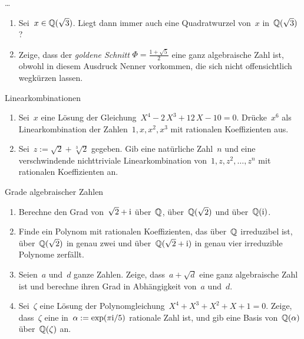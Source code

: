 \documentclass{algblatt}
\begin{document}
\vspace*{-1.5cm}

\begin{aufgabe}{\ldots}
\begin{enumerate}
\item Sei~$x \in \mathbb{Q}(\sqrt{3})$. Liegt dann immer auch eine Quadratwurzel
von~$x$ in~$\mathbb{Q}(\sqrt{3})$?
\item Zeige, dass der \emph{goldene Schnitt} $\Phi = \frac{1+\sqrt{5}}{2}$ eine
ganz algebraische Zahl ist, obwohl in diesem Ausdruck Nenner vorkommen, die
sich nicht offensichtlich wegkürzen lassen.
\end{enumerate}
\end{aufgabe}

\begin{aufgabe}{Linearkombinationen}
\begin{enumerate}
\item Sei~$x$ eine Lösung der Gleichung~$X^4-2\,X^3+12\,X-10=0$. Drücke~$x^6$
als Linearkombination der Zahlen~$1,x,x^2,x^3$ mit rationalen Koeffizienten
aus.
\item Sei~$z := \sqrt{2} + \sqrt[3]{2}$ gegeben. Gib eine
natürliche Zahl~$n$ und eine verschwindende nichttriviale Linearkombination
von~$1,z,z^2,\ldots,z^n$ mit rationalen Koeffizienten an.
\end{enumerate}
\end{aufgabe}

\begin{aufgabe}{Grade algebraischer Zahlen}
\begin{enumerate}
\item Berechne den Grad von~$\sqrt{2} + \mathrm{i}$ über~$\mathbb{Q}$, über~$\mathbb{Q}(\sqrt{2})$ und
über~$\mathbb{Q}(\mathrm{i})$.
\item Finde ein Polynom mit rationalen Koeffizienten, das über~$\mathbb{Q}$
irreduzibel ist, über~$\mathbb{Q}(\sqrt{2})$ in genau zwei und über~$\mathbb{Q}(\sqrt{2}+\mathrm{i})$
in genau vier irreduzible Polynome zerfällt.
\item Seien~$a$ und~$d$ ganze Zahlen. Zeige, dass~$a + \sqrt{d}$ eine ganz
algebraische Zahl ist und berechne ihren Grad in Abhängigkeit von~$a$ und~$d$.
\item Sei~$\zeta$ eine Lösung der Polynomgleichung~$X^4 + X^3 + X^2 + X + 1 =
0$. Zeige, dass~$\zeta$ eine in~$\alpha := \exp(\pi\mathrm{i}/5)$ rationale Zahl ist,
und gib eine Basis von~$\mathbb{Q}(\alpha)$ über~$\mathbb{Q}(\zeta)$ an.
\end{enumerate}
\end{aufgabe}
\end{document}
